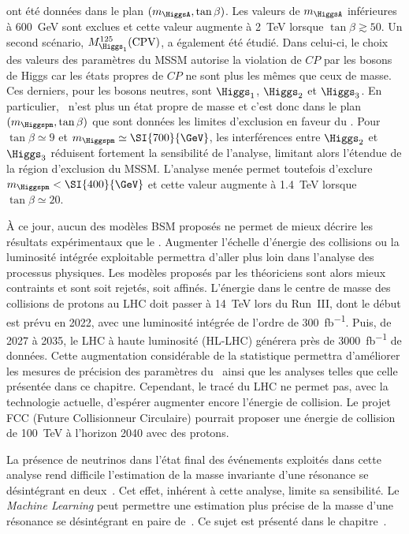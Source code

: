 ont été données
dans le plan
$(m_{\HiggsA},\tan\beta)$.
Les valeurs de $m_{\HiggsA}$ inférieures à \SI{600}{\GeV} sont exclues
et cette valeur augmente à \SI{2}{\TeV} lorsque $\tan\beta\gtrsim\num{50}$.
Un second scénario, $M_{\Higgs_1}^{125}(\text{CPV})$,
a également été étudié.
Dans celui-ci, le choix des valeurs des paramètres du MSSM
autorise la violation de $CP$ par les bosons de Higgs
car les états propres de $CP$ ne sont plus les mêmes que ceux de masse.
Ces derniers, pour les bosons neutres, sont
$\Higgs_1$, $\Higgs_2$ et $\Higgs_3$.
En particulier, \HiggsA\ n'est plus un état propre de masse et c'est donc
dans le plan $(m_{\Higgspm},\tan\beta)$ que sont données les limites d'exclusion en faveur du \SM.
Pour $\tan\beta\simeq\num{9}$ et $m_{\Higgspm}\simeq\SI{700}{\GeV}$,
les interférences entre $\Higgs_2$ et $\Higgs_3$ réduisent fortement la sensibilité de l'analyse,
limitant alors l'étendue de la région d'exclusion du MSSM.
L'analyse menée permet toutefois d'exclure $m_{\Higgspm} < \SI{400}{\GeV}$
et cette valeur augmente à \SI{1.4}{\TeV} lorsque $\tan\beta\simeq\num{20}$.
\par
À ce jour,
aucun des modèles BSM proposés ne permet de mieux décrire les résultats expérimentaux que le \SM.
Augmenter l'échelle d'énergie des collisions ou la luminosité intégrée exploitable permettra d'aller plus loin dans l'analyse des processus physiques.
Les modèles proposés par les théoriciens sont alors mieux contraints et sont soit rejetés, soit affinés.
L'énergie dans le centre de masse des collisions de protons au LHC doit passer à \SI{14}{\TeV} lors du Run~III, dont le début est prévu en 2022, avec une luminosité intégrée de l'ordre de \SI{300}{\femto\barn^{-1}}.
Puis, de 2027 à 2035, le LHC à haute luminosité (HL-LHC) générera près de \SI{3000}{\femto\barn^{-1}} de données.
Cette augmentation considérable de la statistique
permettra d'améliorer les mesures de précision des paramètres du \SM\
ainsi que les analyses telles que celle présentée dans ce chapitre.
Cependant, le tracé du LHC ne permet pas, avec la technologie actuelle, d'espérer augmenter encore l'énergie de collision.
Le projet FCC (Future Collisionneur Circulaire) \cite{FCC} pourrait proposer une énergie de collision de \SI{100}{\TeV} à l'horizon 2040 avec des protons.
\par
La présence de neutrinos dans l'état final des événements exploités dans cette analyse
rend difficile l'estimation de la masse invariante d'une résonance se désintégrant en deux~\tau.
Cet effet, inhérent à cette analyse, limite sa sensibilité.
Le \emph{Machine Learning} peut permettre une estimation plus précise de la masse d'une résonance se désintégrant en paire de~\tau.
Ce sujet est présenté dans le chapitre~\refChML.